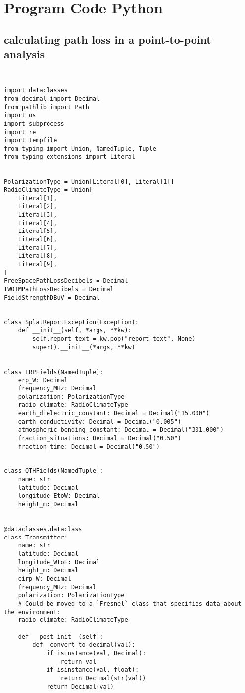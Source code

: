 \chapter{Program Code Python} 
\section{calculating path loss in a point-to-point analysis}
\begin{verbatim}
    

import dataclasses
from decimal import Decimal
from pathlib import Path
import os
import subprocess
import re
import tempfile
from typing import Union, NamedTuple, Tuple
from typing_extensions import Literal


PolarizationType = Union[Literal[0], Literal[1]]
RadioClimateType = Union[
    Literal[1],
    Literal[2],
    Literal[3],
    Literal[4],
    Literal[5],
    Literal[6],
    Literal[7],
    Literal[8],
    Literal[9],
]
FreeSpacePathLossDecibels = Decimal
IWOTMPathLossDecibels = Decimal
FieldStrengthDBuV = Decimal


class SplatReportException(Exception):
    def __init__(self, *args, **kw):
        self.report_text = kw.pop("report_text", None)
        super().__init__(*args, **kw)


class LRPFields(NamedTuple):
    erp_W: Decimal
    frequency_MHz: Decimal
    polarization: PolarizationType
    radio_climate: RadioClimateType
    earth_dielectric_constant: Decimal = Decimal("15.000")
    earth_conductivity: Decimal = Decimal("0.005")
    atmospheric_bending_constant: Decimal = Decimal("301.000")
    fraction_situations: Decimal = Decimal("0.50")
    fraction_time: Decimal = Decimal("0.50")


class QTHFields(NamedTuple):
    name: str
    latitude: Decimal
    longitude_EtoW: Decimal
    height_m: Decimal


@dataclasses.dataclass
class Transmitter:
    name: str
    latitude: Decimal
    longitude_WtoE: Decimal
    height_m: Decimal
    eirp_W: Decimal
    frequency_MHz: Decimal
    polarization: PolarizationType
    # Could be moved to a `Fresnel` class that specifies data about the environment:
    radio_climate: RadioClimateType

    def __post_init__(self):
        def _convert_to_decimal(val):
            if isinstance(val, Decimal):
                return val
            if isinstance(val, float):
                return Decimal(str(val))
            return Decimal(val)


\end{verbatim}
